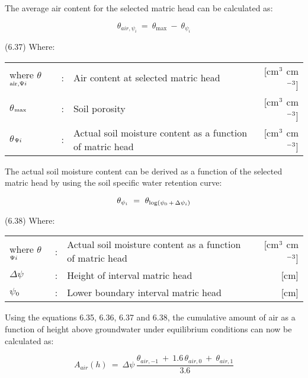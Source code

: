 The average air content for the selected matric head can be calculated as:

\begin{equation}
\theta  _{air, \psi _{i} } ~=~ \theta _{\max } ~-~ \theta  _{\psi _{i} }
\end{equation}

 
\strut\hfill (6.37)
Where:\\
\begin{tabularx}{\textwidth}{llXr}



where $\theta$$_{{\rm air,}{\rm \Psi}{i}}$ &:& Air content at selected matric head  & [cm$^{{\rm 3}}$ cm$^{{\rm -3}}$]\\
$\theta$$_{{\rm max}}$ &:& Soil porosity  & [cm$^{{\rm 3}}$ cm$^{{\rm -3}}$]\\
$\theta$$_{{\rm \Psi}{i}}$ &:& Actual soil moisture content as a function of matric head  & [cm$^{{\rm 3}}$ cm$^{{\rm -3}}$]
\end{tabularx}


The actual soil moisture content can be derived as a function of the selected matric head
by using the soil specific water retention curve:

\begin{equation}
\theta  _{\psi _{i} } ~=~ \theta  _{{\rm log} (\psi _{0} \, +\, \Delta  \psi _{i} )}
\end{equation}

 
\strut\hfill (6.38)
Where:\\
\begin{tabularx}{\textwidth}{llXr}



where $\theta$$_{{\rm \Psi}{i}}$ &:& Actual soil moisture content as a function of matric head  & [cm$^{{\rm 3}}$ cm$^{{\rm -3}}$]\\
$\Delta$$\psi$ &:& Height of interval matric head  & [cm]\\
$\psi$$_{{\rm 0}}$ &:& Lower boundary interval matric head  & [cm]
\end{tabularx}



Using the equations 6.35, 6.36, 6.37 and 6.38, the cumulative amount of air as a function
of height above groundwater under equilibri\-um conditions can now be calculated as: 

\begin{equation}
A _{air} (h) ~=~\Delta  \psi \,{\frac{ \theta  _{air, -1} ~+~ 1.6\, \theta  _{air,0} ~+~ \theta  _{air,1} }{3.6}}
\end{equation}

